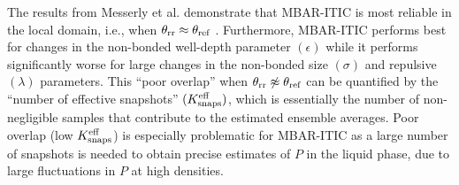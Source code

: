 \documentclass[journal=jced,manuscript=article]{achemso}
\begin{document}




The results from Messerly et al. demonstrate that MBAR-ITIC is most reliable in the local domain, i.e., when $\theta_{\rm rr} \approx \theta_{\rm ref}$ \cite{Postdoc_1}. Furthermore, MBAR-ITIC performs best for changes in the non-bonded well-depth parameter $(\epsilon)$ while it performs significantly worse for large changes in the non-bonded size $(\sigma)$ and repulsive $(\lambda)$ parameters. This ``poor overlap'' when $\theta_{\rm rr} \not\approx \theta_{\rm ref}$ can be quantified by the ``number of effective snapshots'' $(K^{\rm eff}_{\rm snaps})$, which is essentially the number of non-negligible samples that contribute to the estimated ensemble averages. Poor overlap (low $K^{\rm eff}_{\rm snaps}$) is especially problematic for MBAR-ITIC as a large number of snapshots is needed to obtain precise estimates of $P$ in the liquid phase, due to large fluctuations in $P$ at high densities.


\end{document}
